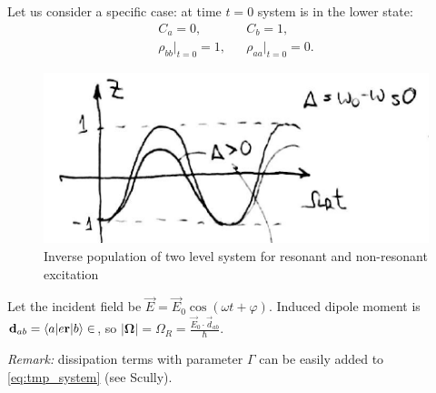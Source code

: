 Let us consider a specific case: at time $t= 0$ system is in the lower state:
\begin{equation}
	\begin{matrix}
			C_a = 0, & & C_b = 1, \\
		\rho_{bb} \big|_{t=0} = 1, & & \rho_{aa} \big|_{t=0} = 0.
	\end{matrix}
\end{equation}
\begin{figure}[h!]
	\centering
	\includegraphics[width=0.6\linewidth]{fig/L5/invers_population}
	\caption{Inverse population of two level system for resonant and non-resonant excitation}
	\label{fig:inverspopulation}
\end{figure}
Let the incident field be $\vec{E} = \vec{E}_0 \cos \left( \omega t + \varphi \right)$. Induced dipole moment is $\mathbf{d}_{ab} = \langle a\rvert e \mathbf{r} \lvert b\rangle \in $, so $\left| \bm{\Omega} \right| = \Omega_R = \frac{\vec{E}_0 \cdot \vec{d}_{ab}}{\hbar}$. 

\textit{Remark:} dissipation terms with parameter $\Gamma$ can be easily added to \eqref{eq:tmp_system} (see Scully).

